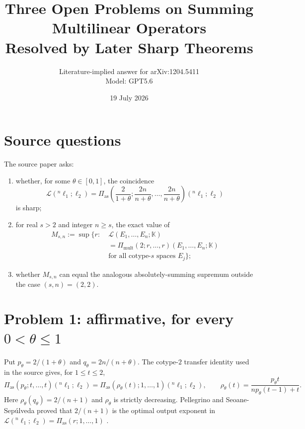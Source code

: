 \documentclass[11pt]{article}
\title{Three Open Problems on Summing Multilinear Operators\\Resolved by Later Sharp Theorems}
\author{Literature-implied answer for arXiv:1204.5411\\Model: GPT5.6}
\date{19 July 2026}
\newcommand{\Las}{\Pi_{\mathrm{as}}}
\newcommand{\Lmult}{\Pi_{\mathrm{mult}}}
\begin{document}
\maketitle

\begin{center}
\end{center}

\section{Source questions}

The source paper \cite[p.~8, Section~4]{Source} asks:
\begin{enumerate}
\item whether, for some $\theta\in[0,1]$, the coincidence
\begin{equation}\label{eq:interp}
 \mathcal L({}^n\ell_1;\ell_2)
 =\Las\!\left(\frac{2}{1+\theta};
       \frac{2n}{n+\theta},\ldots,\frac{2n}{n+\theta}\right)
       ({}^n\ell_1;\ell_2)
\end{equation}
is sharp;
\item for real $s>2$ and integer $n\ge s$, the exact value of
\begin{equation}\label{eq:M}
\begin{aligned}
 M_{s,n}:=\sup\bigl\{r:\;&\mathcal L(E_1,\ldots,E_n;\mathbb K)\\
 &=\Lmult(2;r,\ldots,r)(E_1,\ldots,E_n;\mathbb K)\\[-2pt]
 &\text{for all cotype-$s$ spaces }E_j\bigr\};
\end{aligned}
\end{equation}
\item whether $M_{s,n}$ can equal the analogous absolutely-summing
supremum outside the case $(s,n)=(2,2)$.
\end{enumerate}

\section{Problem 1: affirmative, for every \texorpdfstring{$0<\theta\le1$}{0<theta<=1}}

Put $p_\theta=2/(1+\theta)$ and $q_\theta=2n/(n+\theta)$.
The cotype-$2$ transfer identity used in the source gives, for $1\le t\le2$,
\begin{equation}\label{eq:transfer}
 \Las(p_\theta;t,\ldots,t)({}^n\ell_1;\ell_2)
 =\Las\!\left(\rho_\theta(t);1,\ldots,1\right)
 ({}^n\ell_1;\ell_2),
 \qquad
 \rho_\theta(t)=
 \frac{p_\theta t}{n p_\theta(t-1)+t}.
\end{equation}
Here $\rho_\theta(q_\theta)=2/(n+1)$ and $\rho_\theta$ is strictly
decreasing.  Pellegrino and Seoane-Sep\'ulveda proved that $2/(n+1)$ is the
optimal output exponent in
\(\mathcal L({}^n\ell_1;\ell_2)=\Las(r;1,\ldots,1)\)
\cite[Theorem~1.1]{PS}.
\end{document}
